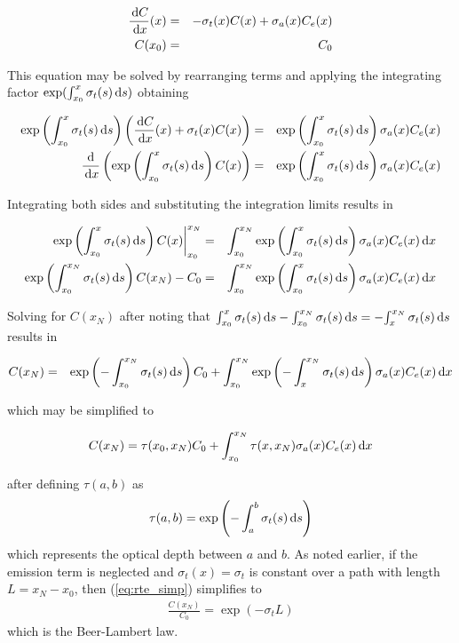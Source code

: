 \begin{eqnarray}
\frac{\,\mbox{d}C}{\,\mbox{d}x}(x)&=&-\sigma_t(x) C(x) + \sigma_a(x) C_e(x)\\
 C(x_0)&=&C_0
\end{eqnarray}

This equation may be solved by rearranging terms and applying the integrating factor $\exp(\int_{x_0}^x \sigma_t(s) \,\mbox{d}s)$ obtaining

\begin{eqnarray}
\exp\left({\int_{x_0}^{x} \sigma_t(s) \,\mbox{d}s}\right)\left(\frac{\,\mbox{d}C}{\,\mbox{d}x}(x)+\sigma_t(x) C(x)\right)&=&  \exp\left({\int_{x_0}^{x} \sigma_t(s) \,\mbox{d}s}\right)\sigma_a(x) C_e(x)\\
\frac{\mbox{d}}{\,\mbox{d}x}\left(\exp\left({\int_{x_0}^{x} \sigma_t(s) \,\mbox{d}s}\right) C(x)\right)&=& \exp\left({\int_{x_0}^{x} \sigma_t(s) \,\mbox{d}s}\right)\sigma_a(x) C_e(x)
\end{eqnarray}

Integrating both sides and substituting the integration limits results in

\begin{eqnarray}
\left.\exp\left({\int_{x_0}^{x} \sigma_t(s) \,\mbox{d}s}\right) C(x)\right|_{x_0}^{x_N}&=& \int_{x_0}^{x_N}\exp\left({\int_{x_0}^{x} \sigma_t(s) \,\mbox{d}s}\right)\sigma_a(x) C_e(x) \,\mbox{d}x \\
\exp\left({\int_{x_0}^{x_N} \sigma_t(s) \,\mbox{d}s}\right) C(x_N)-C_0&=& \int_{x_0}^{x_N}\exp\left({\int_{x_0}^{x} \sigma_t(s) \,\mbox{d}s}\right)\sigma_a(x) C_e(x) \,\mbox{d}x
\end{eqnarray}

Solving for $C(x_N)$ after noting that ${\int_{x_0}^{x} \sigma_t(s) \,\mbox{d}s}-{\int_{x_0}^{x_N} \sigma_t(s) \,\mbox{d}s}=-{\int_{x}^{x_N} \sigma_t(s) \,\mbox{d}s}$ results in

\begin{eqnarray}
C(x_N)&=&\exp\left({-\int_{x_0}^{x_N} \sigma_t(s) \,\mbox{d}s}\right) C_0+ \int_{x_0}^{x_N}\exp\left({-\int_{x}^{x_N} \sigma_t(s) \,\mbox{d}s}\right)\sigma_a(x)
C_e(x) \,\mbox{d}x
\end{eqnarray}

\noindent which may be simplified to

\begin{equation}
\label{eq:rte_simp}
\label{eq:rtesoln}
 C(x_N)=\tau(x_0,x_N)C_0 + \int_{x_0}^{x_N}\tau(x,x_N)\sigma_a(x)C_e(x) \,\mbox{d}x
\end{equation}

\noindent after defining $\tau(a,b)$ as
\begin{equation}
\label{eq:optdepth}
\tau(a,b)=\exp\left({-\int_{a}^{b} \sigma_t(s) \,\mbox{d}s}\right)
\end{equation}
which represents the optical depth between $a$ and $b$.  As noted earlier, if the emission term is neglected and $\sigma_t(x)=\sigma_t$ is constant over a path with length
$L=x_N-x_0$, then (\ref{eq:rte_simp}) simplifies to
\begin{eqnarray}
 \frac{C(x_N)}{C_0}=\exp(-\sigma_tL)
\end{eqnarray}
which is the Beer-Lambert law.



